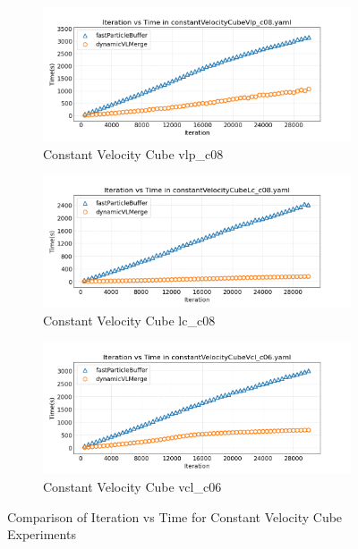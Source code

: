\begin{figure}[htbp]
    \centering
    \vspace{-0.5em}
    \begin{subfigure}[b]{\textwidth}
        \centering
        \includegraphics[width=0.9\linewidth]{graphs/constantVelocityCube/normalExperiments/iter/vlpc08.png}
        \vspace{-0.5em}
        \caption{\scriptsize Constant Velocity Cube vlp\_c08}
        \label{fig:vlpc08constantCubeIter}
    \end{subfigure}

    \begin{subfigure}[b]{\textwidth}
        \centering
        \includegraphics[width=0.9\linewidth]{graphs/constantVelocityCube/normalExperiments/iter/lcc08.png}
        \vspace{-0.5em}
        \caption{\scriptsize Constant Velocity Cube lc\_c08}
        \label{fig:lcc08constantCubeIter}
    \end{subfigure}

    \begin{subfigure}[b]{\textwidth}
        \centering
        \includegraphics[width=0.9\linewidth]{graphs/constantVelocityCube/normalExperiments/iter/vclc06.png}
        \vspace{-0.5em}
        \caption{\scriptsize Constant Velocity Cube vcl\_c06}
        \label{fig:vclc06constantCubeIter}
    \end{subfigure}

    \vspace{1em}
    \caption{Comparison of Iteration vs Time for Constant Velocity Cube Experiments}
    \label{fig:mainConstantCubeIter}
\end{figure}








